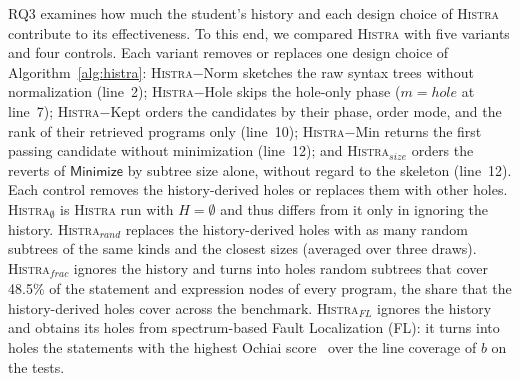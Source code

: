 \documentclass[10pt,conference]{IEEEtran}
\begin{document}
RQ3 examines how much the student's history and each design choice of \textsc{Histra} contribute to its effectiveness. To this end, we compared \textsc{Histra} with five variants and four controls. Each variant removes or replaces one design choice of Algorithm~\ref{alg:histra}: \textsc{Histra}$-$Norm sketches the raw syntax trees without normalization (line~2); \textsc{Histra}$-$Hole skips the hole-only phase ($m = \mathit{hole}$ at line~7); \textsc{Histra}$-$Kept orders the candidates by their phase, order mode, and the rank of their retrieved programs only (line~10); \textsc{Histra}$-$Min returns the first passing candidate without minimization (line~12); and \textsc{Histra}$_{\mathit{size}}$ orders the reverts of $\mathsf{Minimize}$ by subtree size alone, without regard to the skeleton (line~12). Each control removes the history-derived holes or replaces them with other holes. \textsc{Histra}$_{\emptyset}$ is \textsc{Histra} run with $H = \emptyset$ and thus differs from it only in ignoring the history. \textsc{Histra}$_{\mathit{rand}}$ replaces the history-derived holes with as many random subtrees of the same kinds and the closest sizes (averaged over three draws). \textsc{Histra}$_{\mathit{frac}}$ ignores the history and turns into holes random subtrees that cover 48.5\% of the statement and expression nodes of every program, the share that the history-derived holes cover across the benchmark. \textsc{Histra}$_{\mathit{FL}}$ ignores the history and obtains its holes from spectrum-based Fault Localization (FL): it turns into holes the statements with the highest Ochiai score~\cite{abreu2006evaluation} over the line coverage of $b$ on the tests.
\end{document}

